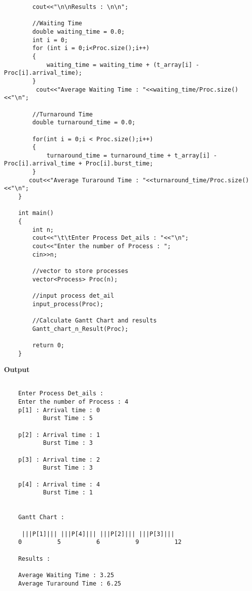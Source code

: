 \documentclass{article}
\begin{document}
\begin{enumerate}
{\begin{verbatim}
        cout<<"\n\nResults : \n\n";
    
        //Waiting Time
        double waiting_time = 0.0;
        int i = 0;
        for (int i = 0;i<Proc.size();i++)
        {
            waiting_time = waiting_time + (t_array[i] - Proc[i].arrival_time);
        }
         cout<<"Average Waiting Time : "<<waiting_time/Proc.size()<<"\n";
    
        //Turnaround Time
        double turnaround_time = 0.0;
    
        for(int i = 0;i < Proc.size();i++)
        {
            turnaround_time = turnaround_time + t_array[i] - Proc[i].arrival_time + Proc[i].burst_time;
        }
       cout<<"Average Turaround Time : "<<turnaround_time/Proc.size()<<"\n";
    }
    
    int main()
    {
        int n;
        cout<<"\t\tEnter Process Det_ails : "<<"\n";
        cout<<"Enter the number of Process : ";
        cin>>n;
    
        //vector to store processes
        vector<Process> Proc(n);
    
        //input process det_ail
        input_process(Proc);
    
        //Calculate Gantt Chart and results
        Gantt_chart_n_Result(Proc);
        
        return 0;
    }

\end{verbatim}
\textbf{Output}
\begin{verbatim}

    Enter Process Det_ails : 
    Enter the number of Process : 4
    p[1] : Arrival time : 0
           Burst Time : 5
    
    p[2] : Arrival time : 1
           Burst Time : 3
    
    p[3] : Arrival time : 2
           Burst Time : 3
    
    p[4] : Arrival time : 4
           Burst Time : 1
    
    
    Gantt Chart :
    
     |||P[1]||| |||P[4]||| |||P[2]||| |||P[3]|||
    0          5          6          9          12
    
    Results :
    
    Average Waiting Time : 3.25
    Average Turaround Time : 6.25

\end{verbatim}
}

\end{enumerate}
\end{document}
